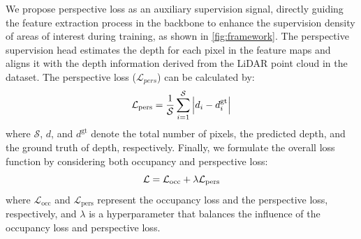 \documentclass[journal]{IEEEtran}
\begin{document}
We propose perspective loss as an auxiliary supervision signal, directly guiding the feature extraction process in the backbone to enhance the supervision density of areas of interest during training, as shown in \autoref{fig:framework}.
The perspective supervision head estimates the depth for each pixel in the feature maps and aligns it with the depth information derived from the LiDAR point cloud in the dataset.
The perspective loss ({\small $\mathcal{L}_{pers}$}) can be calculated by:
\begin{equation} \small
\mathcal{L}_{\text{pers}} = \frac{1}{\mathcal{S}} \sum_{i=1}^{\mathcal{S}} \left| d_i - d_i^{\text{gt}} \right|
\end{equation}
where {\small $\mathcal{S}$}, $d$, and $d^{\text{gt}}$ denote the total number of pixels, the predicted depth, and the ground truth of depth, respectively.
Finally, we formulate the overall loss function by considering both occupancy and perspective loss:
\begin{equation} \small
\mathcal{L} = \mathcal{L}_{\text{occ}} + \lambda \mathcal{L}_{\text{pers}}
\end{equation}
where $\mathcal{L}_{\text{occ}}$ and $\mathcal{L}_{\text{pers}}$ represent the occupancy loss and the perspective loss, respectively, and $\lambda$ is a hyperparameter that balances the influence of the occupancy loss and perspective loss.
\end{document}
